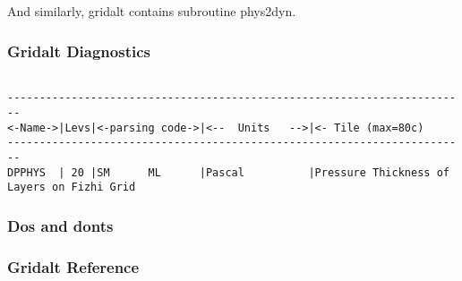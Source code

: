 \noindent And similarly, gridalt contains subroutine phys2dyn.

\subsubsection {Gridalt Diagnostics}
\label{sec:pkg:gridalt:diagnostics}

{\footnotesize
\begin{verbatim}

------------------------------------------------------------------------
<-Name->|Levs|<-parsing code->|<--  Units   -->|<- Tile (max=80c) 
------------------------------------------------------------------------
DPPHYS  | 20 |SM      ML      |Pascal          |Pressure Thickness of Layers on Fizhi Grid
\end{verbatim}
}

\subsubsection {Dos and donts}

\subsubsection {Gridalt Reference} 
